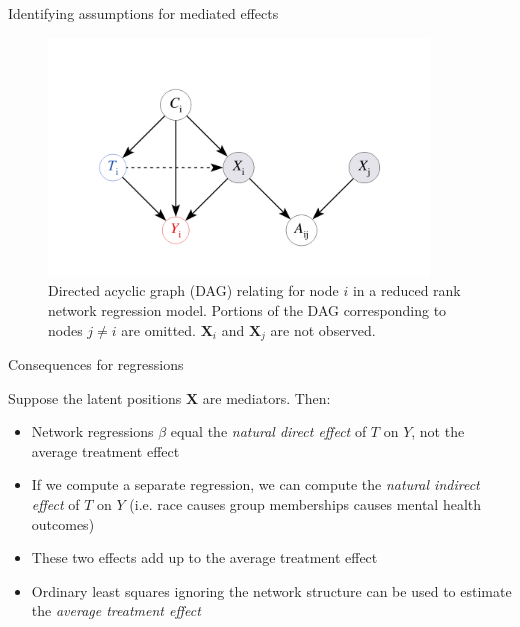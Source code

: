 \documentclass{beamer}
\theoremstyle{remark}
\newcommand{\X}{\bm X}
\begin{document}
\begin{frame}{Identifying assumptions for mediated effects}

    \centering

    \begin{figure}
        \includegraphics[width=0.9\textwidth]{figures/mediating.png}
        \caption{Directed acyclic graph (DAG) relating for node $i$ in a reduced rank network regression model. Portions of the DAG corresponding to nodes $j \neq i$ are omitted. $\X_i$ and $\X_j$ are not observed.}
        \label{fig:mediating}
    \end{figure}

\end{frame}





\begin{frame}{Consequences for regressions}

    Suppose the latent positions $\X$ are mediators. Then:

    \begin{itemize}
        \item Network regressions $\beta$ equal the \emph{natural direct effect} of $T$ on $Y$, not the average treatment effect
        \item If we compute a separate regression, we can compute the \emph{natural indirect effect} of $T$ on $Y$ (i.e. race causes group memberships causes mental health outcomes)
        \item These two effects add up to the average treatment effect
        \item Ordinary least squares ignoring the network structure can be used to estimate the \emph{average treatment effect}
    \end{itemize}

\end{frame}
\end{document}
